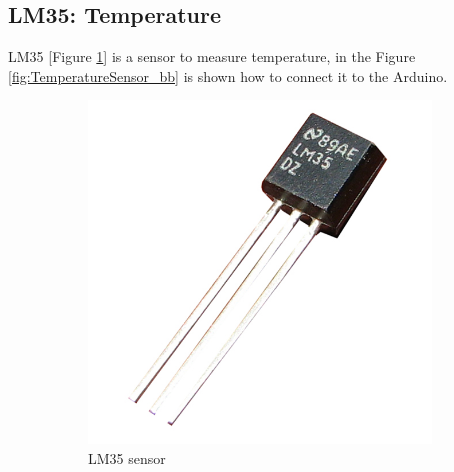 \documentclass[12pt, a4paper,twoside]{tesi_upf}
\begin{document}
    \subsection{LM35: Temperature}
      LM35 [Figure \ref{fig:LM35}] is a sensor to measure temperature, in the Figure \ref{fig:TemperatureSensor_bb} is shown how to connect it to the Arduino.
      \cite{LM35}
      
      \begin{figure}
        \centering
        \begin{subfigure}[b]{0.3\textwidth}
                \includegraphics[width=\textwidth]{./Figures/LM35.jpg}
                \caption{LM35 sensor}
                \label{fig:LM35}
        \end{subfigure}%
        ~ %
        \begin{subfigure}[b]{0.3\textwidth}

\end{subfigure}
\end{figure}
\end{document}
